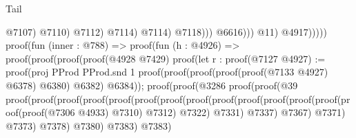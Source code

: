 \begin{lexlean}{Tail}
\begin{coremodule}
                                                                          @7107)
                                                                        @7110)
                                                                      @7112)
                                                                    @7114)
                                                                  @7114)
                                                                @7118)))
                                                      @6616)))
                                              @11)
                                            @4917)))))
                                proof(fun (inner : @788) =>
                                  proof(fun (h : @4926) =>
                                    proof(proof(proof(proof(@4928 @7429)
                                            proof(let r : proof(@7127
                                                  @4927) := proof(proj PProd PProd.snd 1
                                                proof(proof(proof(proof(proof(@7133 @4927) @6378)
                                                        @6380)
                                                      @6382)
                                                    @6384));
                                              proof(proof(@3286
                                                    proof(proof(@39
                                                          proof(proof(proof(proof(proof(proof(proof(proof(proof(proof(proof(proof(proof(proof(proof(@7306
                                                                                          @4933)
                                                                                        @7310)
                                                                                      @7312)
                                                                                    @7322)
                                                                                  @7331)
                                                                                @7337)
                                                                              @7367)
                                                                            @7371)
                                                                          @7373)
                                                                        @7378)
                                                                      @7380)
                                                                    @7383)
                                                                  @7383)

\end{coremodule}
\end{lexlean}
